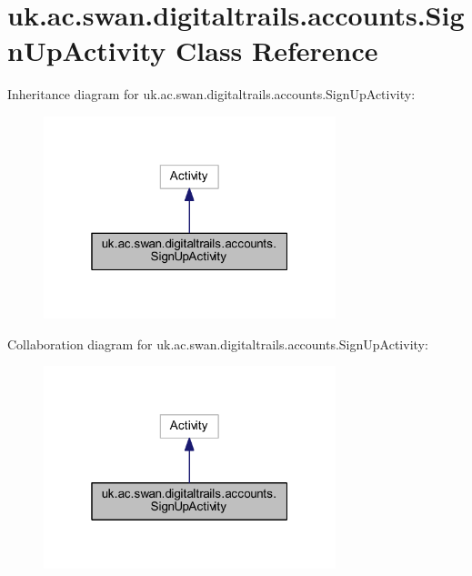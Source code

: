 \hypertarget{classuk_1_1ac_1_1swan_1_1digitaltrails_1_1accounts_1_1_sign_up_activity}{\section{uk.\+ac.\+swan.\+digitaltrails.\+accounts.\+Sign\+Up\+Activity Class Reference}
\label{classuk_1_1ac_1_1swan_1_1digitaltrails_1_1accounts_1_1_sign_up_activity}
}


Inheritance diagram for uk.\+ac.\+swan.\+digitaltrails.\+accounts.\+Sign\+Up\+Activity\+:\nopagebreak
\begin{figure}[H]
\begin{center}
\leavevmode
\includegraphics[width=241pt]{classuk_1_1ac_1_1swan_1_1digitaltrails_1_1accounts_1_1_sign_up_activity__inherit__graph}
\end{center}
\end{figure}


Collaboration diagram for uk.\+ac.\+swan.\+digitaltrails.\+accounts.\+Sign\+Up\+Activity\+:\nopagebreak
\begin{figure}[H]
\begin{center}
\leavevmode
\includegraphics[width=241pt]{classuk_1_1ac_1_1swan_1_1digitaltrails_1_1accounts_1_1_sign_up_activity__coll__graph}
\end{center}
\end{figure}
